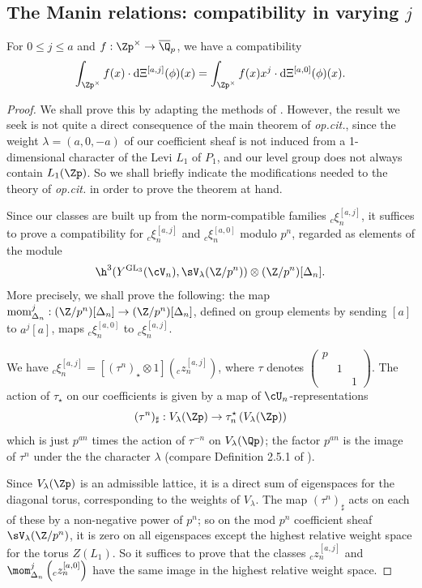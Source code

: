 \documentclass[10pt,reqno,a4paper]{amsart}
\newcommand{\sdthree}[3]{\left(\begin{smallmatrix}#1 \\ & #2\\ && #3\end{smallmatrix}\right)}
\newcommand{\GL}{\mathrm{GL}}
\begin{document}
\subsection{The Manin relations: compatibility in varying \texorpdfstring{$j$}{j}}\label{sec:vary j}
\begin{theorem}\label{theorem:compatibility}
For $0 \leq j \leq a$ and $f : \Zp^\times \to \overline{\Q}_p$, we have a compatibility
\[
\int_{\Zp^\times} f(x) \cdot \mathrm{d}\Xi^{[a,j]}(\phi)(x) = \int_{\Zp^\times} f(x)x^{j} \cdot \mathrm{d} \Xi^{[a,0]}(\phi)(x).
\]

\end{theorem}



\begin{proof}
We shall prove this by adapting the methods of \cite{spherical_II}. However, the result we seek is not quite a direct consequence of the main theorem of \emph{op.cit.}, since the weight $\lambda = (a, 0, -a)$ of our coefficient sheaf is not induced from a 1-dimensional character of the Levi $L_1$ of $P_1$, and our level group does not always contain $L_1(\Zp)$. So we shall briefly indicate the modifications needed to the theory of \emph{op.cit.} in order to prove the theorem at hand.

Since our classes are built up from the norm-compatible families ${}_c \xi^{[a, j]}_n$, it suffices to prove a compatibility for ${}_c \xi^{[a, j]}_n$ and ${}_c \xi^{[a, 0]}_n$ modulo $p^n$, regarded as elements of the module \[\h^3(Y^{\GL_3}(\cV_n), \sV_\lambda(\Z/p^n)) \otimes (\Z/p^n)[\Delta_n].\] More precisely, we shall prove the following: the map $\operatorname{mom}^j_{\Delta_n}: (\Z/p^n)[\Delta_n] \to (\Z/p^n)[\Delta_n]$, defined on group elements by sending $[a]$ to $a^j[a]$, maps ${}_c \xi^{[a, 0]}_n$ to ${}_c \xi^{[a, j]}_n$.

We have ${}_c \xi^{[a, j]}_n = [(\tau^n)_\star \otimes 1]\left({}_c z^{[a, j]}_n\right)$, where $\tau$ denotes $\sdthree{p}{1}{1}$. The action of $\tau_\star$ on our coefficients is given by a map of $\cU_n$-representations
\[ (\tau^n)_{\sharp}: V_\lambda(\Zp) \to \tau_n^\star\left( V_\lambda(\Zp)\right)\]
which is just $p^{an}$ times the action of $\tau^{-n}$ on $V_\lambda(\Qp)$; the factor $p^{an}$ is the image of $\tau^n$ under the the character $\lambda$ (compare Definition 2.5.1 of \cite{spherical_II}).

Since $V_\lambda(\Zp)$ is an admissible lattice, it is a direct sum of eigenspaces for the diagonal torus, corresponding to the weights of $V_\lambda$. The map $(\tau^n)_\sharp$ acts on each of these by a non-negative power of $p^n$; so on the mod $p^n$ coefficient sheaf $\sV_\lambda(\Z/p^n)$, it is zero on all eigenspaces except the highest relative weight space for the torus $Z(L_1)$. So it suffices to prove that the classes ${}_c z^{[a, j]}_n$ and $\mom^j_{\Delta_n}\left( {}_c z^{[a, 0]}_n\right)$ have the same image in the highest relative weight space.


\end{proof}
\end{document}
